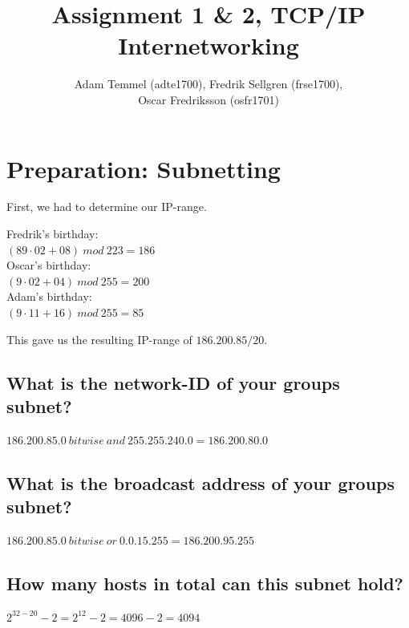 \documentclass[a4paper, titlepage,12pt]{article}
\title{Assignment 1 \& 2, TCP/IP Internetworking}
\author{Adam Temmel (adte1700), Fredrik Sellgren (frse1700),\\Oscar Fredriksson (osfr1701)}
\begin{document}
	\maketitle
	\section{Preparation: Subnetting}\label{sec:introduction}

	First, we had to determine our IP-range.\\

	\begin{center}
		Fredrik's birthday:\\
		$(89\cdot02+08) \ mod \ 223 = 186$\\
		Oscar's birthday:\\
		$(9\cdot02+04) \ mod \ 255 = 200$\\
		Adam's birthday:\\
		$(9\cdot11+16) \ mod \ 255 = 85$\\
	\end{center}

	This gave us the resulting IP-range of $186.200.85/20$.

	\subsection{What is the network-ID of your groups subnet?}

		\begin{center}
			$186.200.85.0 \ bitwise \ and \ 255.255.240.0 = 186.200.80.0$\\
		\end{center}

	\subsection{What is the broadcast address of your groups subnet?}

		\begin{center}
			$186.200.85.0 \ bitwise \ or \ 0.0.15.255 = 186.200.95.255$\\
		\end{center}

	\subsection{How many hosts in total can this subnet hold?}

		\begin{center}
			$2^{32-20} - 2 = 2^{12} - 2 = 4096 - 2 = 4094$\\
		\end{center}
\end{document}
